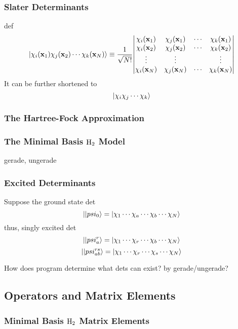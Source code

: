 \documentclass[a4paper]{article}
\numberwithin{equation}{section}
\begin{document}
\subsubsection{Slater Determinants}
def
\begin{equation}\label{key}
\ket{\chi_i(\vb{x}_1)\chi_j(\vb{x}_2)\cdots\chi_k(\vb{x}_N)} 
\equiv \dfrac{1}{\sqrt{N!}}
\mqty| \chi_i(\vb{x}_1) & \chi_j(\vb{x}_1) & \cdots & \chi_k(\vb{x}_1)\\
        \chi_i(\vb{x}_2) & \chi_j(\vb{x}_2) & \cdots & \chi_k(\vb{x}_2)\\
        \vdots & \vdots & & \vdots \\
        \chi_i(\vb{x}_N) & \chi_j(\vb{x}_N) & \cdots & \chi_k(\vb{x}_N)|
\end{equation}
It can be further shortened to
\begin{equation}\label{key}
\ket{\chi_i\chi_j\cdots\chi_k}
\end{equation}
\subsubsection{The Hartree-Fock Approximation}
\subsubsection{The Minimal Basis $ \ce{H_2} $ Model}
gerade, ungerade
\subsubsection{Excited Determinants}
Suppose the ground state det
\begin{equation}\label{key}
\ket{|psi_0} = \ket{\chi_1\cdots\chi_a\cdots\chi_b\cdots\chi_N}
\end{equation}
thus, singly excited det
\begin{equation}\label{key}
\ket{|psi_a^r} = \ket{\chi_1\cdots\chi_r\cdots\chi_b\cdots\chi_N}
\end{equation}
\begin{equation}\label{key}
\ket{|psi_{ab}^{rs}} = \ket{\chi_1\cdots\chi_r\cdots\chi_s\cdots\chi_N}
\end{equation}

How does program determine what dets can exist? by gerade/ungerade?

\subsection{Operators and Matrix Elements}
\subsubsection{Minimal Basis $ \ce{H_2} $ Matrix Elements}
\end{document}
